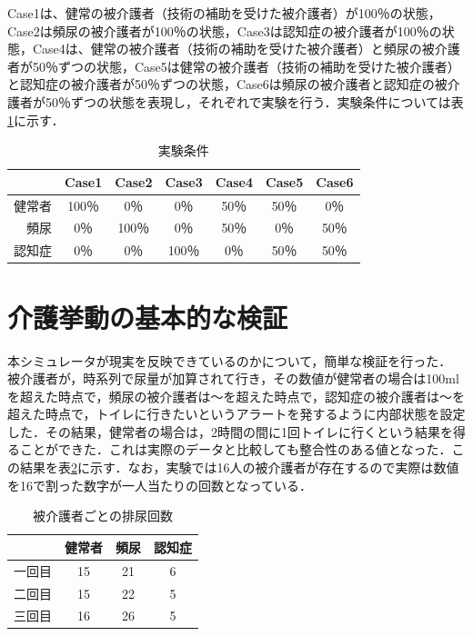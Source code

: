 Case1は、健常の被介護者（技術の補助を受けた被介護者）が100％の状態，Case2は頻尿の被介護者が100％の状態，Case3は認知症の被介護者が100％の状態，Case4は、健常の被介護者（技術の補助を受けた被介護者）と頻尿の被介護者が50％ずつの状態，Case5は健常の被介護者（技術の補助を受けた被介護者）と認知症の被介護者が50％ずつの状態，Case6は頻尿の被介護者と認知症の被介護者が50％ずつの状態を表現し，それぞれで実験を行う．実験条件については表\ref{experiment}に示す．

\begin{table}[htb]
  \caption[実験条件]{実験条件}
  \label{experiment}
  \centering
  \begin{tabular}{r|c|c|c|c|c|c}
     & Case1 & Case2 & Case3 & Case4 & Case5 & Case6 \\ \hline
    健常者 & 100％ & 0％ & 0％ & 50％ & 50％ & 0％ \\
    頻尿   & 0％ & 100％ & 0％ & 50％ & 0％ & 50％ \\
    認知症 & 0％ & 0％ & 100％ & 0％ & 50％ & 50％ \\
    \end{tabular}
\end{table}

\section{介護挙動の基本的な検証}

本シミュレータが現実を反映できているのかについて，簡単な検証を行った．
被介護者が，時系列で尿量が加算されて行き，その数値が健常者の場合は100mlを超えた時点で，頻尿の被介護者は〜を超えた時点で，認知症の被介護者は〜を超えた時点で，トイレに行きたいというアラートを発するように内部状態を設定した．その結果，健常者の場合は，2時間の間に1回トイレに行くという結果を得ることができた．これは実際のデータと比較しても整合性のある値となった．この結果を表\ref{number_of_urination}に示す．なお，実験では16人の被介護者が存在するので実際は数値を16で割った数字が一人当たりの回数となっている．

\begin{table}[htb]
  \caption[被介護者ごとの排尿回数]{被介護者ごとの排尿回数}
  \label{number_of_urination}
  \centering
  \begin{tabular}{r|c|c|c}
     & 健常者 & 頻尿 & 認知症 \\ \hline
    一回目 & 15 & 21 & 6 \\
    二回目 & 15 & 22 & 5 \\
    三回目 & 16 & 26 & 5 \\
    \end{tabular}
\end{table}

